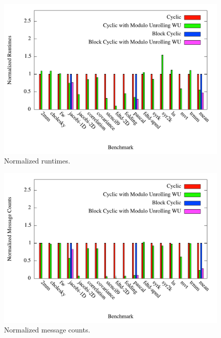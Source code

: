 \begin{figure}
	\begin{center}
	\includegraphics[scale=0.30]{./Figures/runtimes}
	\caption{Normalized runtimes.}
	\label{runtimes}
	\end{center}
\end{figure}

\begin{figure}
	\begin{center}
	\includegraphics[scale=0.30]{./Figures/message_counts}
	\caption{Normalized message counts.}
	\label{message_counts}
	\end{center}
\end{figure}

